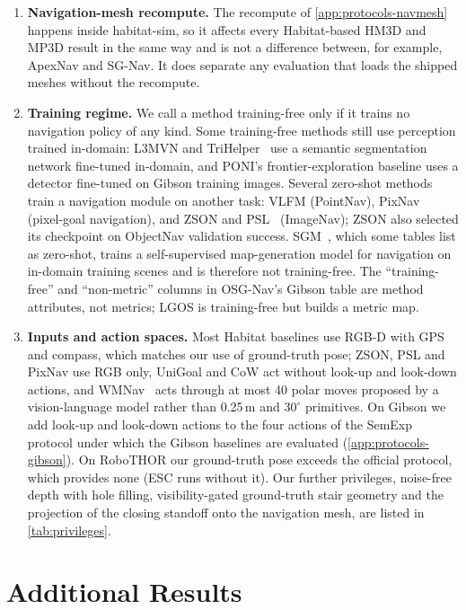\documentclass[10pt]{article}
\newcommand{\ours}{LGOS\xspace}
\begin{document}
\begin{enumerate}[leftmargin=*,itemsep=2pt]
\item \textbf{Navigation-mesh recompute.} The recompute of \cref{app:protocols-navmesh} happens inside habitat-sim, so it affects every Habitat-based HM3D and MP3D result in the same way and is not a difference between, for example, ApexNav and SG-Nav. It does separate any evaluation that loads the shipped meshes without the recompute.
\item \textbf{Training regime.} We call a method training-free only if it trains no navigation policy of any kind. Some training-free methods still use perception trained in-domain: L3MVN and TriHelper~\citep{zhang2024trihelper} use a semantic segmentation network fine-tuned in-domain, and PONI's frontier-exploration baseline uses a detector fine-tuned on Gibson training images. Several zero-shot methods train a navigation module on another task: VLFM (PointNav), PixNav~\citep{cai2024bridging} (pixel-goal navigation), and ZSON and PSL~\citep{sun2024prioritized} (ImageNav); ZSON also selected its checkpoint on ObjectNav validation success. SGM~\citep{zhang2024imagine}, which some tables list as zero-shot, trains a self-supervised map-generation model for navigation on in-domain training scenes and is therefore not training-free. The ``training-free'' and ``non-metric'' columns in OSG-Nav's Gibson table are method attributes, not metrics; \ours is training-free but builds a metric map.
\item \textbf{Inputs and action spaces.} Most Habitat baselines use RGB-D with GPS and compass, which matches our use of ground-truth pose; ZSON, PSL and PixNav use RGB only, UniGoal and CoW act without look-up and look-down actions, and WMNav~\citep{nie2025wmnav} acts through at most 40 polar moves proposed by a vision-language model rather than 0.25\,m and $30^\circ$ primitives. On Gibson we add look-up and look-down actions to the four actions of the SemExp protocol under which the Gibson baselines are evaluated (\cref{app:protocols-gibson}). On RoboTHOR our ground-truth pose exceeds the official protocol, which provides none (ESC runs without it). Our further privileges, noise-free depth with hole filling, visibility-gated ground-truth stair geometry and the projection of the closing standoff onto the navigation mesh, are listed in \cref{tab:privileges}.
\end{enumerate}

\section{Additional Results}\label{app:additional}
\end{document}
